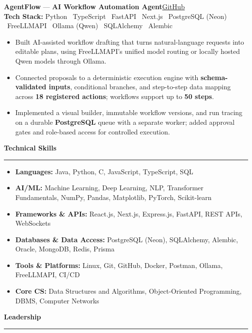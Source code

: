 \documentclass[10pt,a4paper]{article}
\newcommand{\sectionheading}[1]{%
  \par\vspace{3pt}%
  \textbf{\large #1}\\[-8pt]
  \hrule
  \vspace{3pt}%
}
\newcommand{\projectheader}[4]{%
  \noindent\textbf{#1} --- \textbf{#2}\hfill\href{#3}{GitHub}\\[1pt]
  \textbf{Tech Stack:} #4%
}
\begin{document}
\vspace{4pt}

\projectheader
{AgentFlow}
{AI Workflow Automation Agent}
{https://github.com/Thushar070/AgentFlow}
{Python \textperiodcentered\ TypeScript \textperiodcentered\ FastAPI \textperiodcentered\ Next.js \textperiodcentered\ PostgreSQL (Neon) \textperiodcentered\ FreeLLMAPI \textperiodcentered\ Ollama (Qwen) \textperiodcentered\ SQLAlchemy \textperiodcentered\ Alembic}

\begin{itemize}
\item Built AI-assisted workflow drafting that turns natural-language requests into editable plans, using FreeLLMAPI's unified model routing or locally hosted Qwen models through Ollama.
\item Connected proposals to a deterministic execution engine with \textbf{schema-validated inputs}, conditional branches, and step-to-step data mapping across \textbf{18 registered actions}; workflows support up to \textbf{50 steps}.
\item Implemented a visual builder, immutable workflow versions, and run tracing on a durable \textbf{PostgreSQL} queue with a separate worker; added approval gates and role-based access for controlled execution.
\end{itemize}

\sectionheading{Technical Skills}

\begingroup
\sloppy
\begin{itemize}
\item \textbf{Languages:} Java, Python, C, JavaScript, TypeScript, SQL
\item \textbf{AI/ML:} Machine Learning, Deep Learning, NLP, Transformer Fundamentals, NumPy, Pandas, Matplotlib, PyTorch, Scikit-learn
\item \textbf{Frameworks \& APIs:} React.js, Next.js, Express.js, FastAPI, REST APIs, WebSockets
\item \textbf{Databases \& Data Access:} PostgreSQL (Neon), SQLAlchemy, Alembic, Oracle, MongoDB, Redis, Prisma
\item \textbf{Tools \& Platforms:} Linux, Git, GitHub, Docker, Postman, Ollama, FreeLLMAPI, CI/CD
\item \textbf{Core CS:} Data Structures and Algorithms, Object-Oriented Programming, DBMS, Computer Networks
\end{itemize}
\endgroup

\sectionheading{Leadership}
\end{document}
